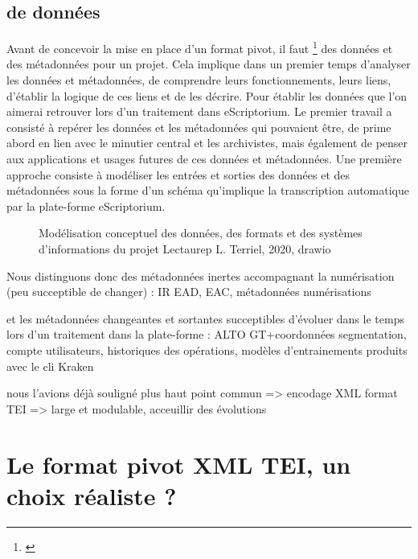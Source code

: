 \subsection{ de données}\label{Circonscrire un monde de données}

Avant de concevoir la mise en place d'un format pivot, il faut \footnote{\cite{poupeau_visite_2019}} des données et des métadonnées pour un projet. Cela implique dans un premier temps d'analyser les données et métadonnées, de comprendre leurs fonctionnements, leurs liens, d'établir la logique de ces liens et de les décrire. Pour établir les données que l'on aimerai retrouver lors d'un traitement dans eScriptorium. 
Le premier travail a consisté à repérer les données et les métadonnées qui pouvaient être, de prime abord en lien avec le minutier central et les archivistes, mais également de penser aux applications et usages futures de ces données et métadonnées. Une première approche consiste à modéliser les entrées et sorties des données et des métadonnées sous la forme d'un schéma qu'implique la transcription automatique par la plate-forme eScriptorium. 
\begin{figure}[h]
    \centering
    \centerline{}
    \caption{Modélisation conceptuel des données, des formats et des systèmes d'informations du projet Lectaurep \textcopyright L. Terriel, 2020, drawio}
    \label{fig:modélisation_données_lectaurep}
\end{figure}

Nous distinguons donc des métadonnées inertes accompagnant la numérisation (peu succeptible de changer) : IR EAD, EAC, métadonnées numérisations

et les métadonnées changeantes et sortantes succeptibles d'évoluer dans le temps lors d'un traitement dans la plate-forme :
ALTO GT+coordonnées segmentation, compte utilisateurs, historiques des opérations, modèles d'entrainements produits avec le cli Kraken

nous l'avions déjà souligné plus haut point commun => encodage XML 
format TEI => large et modulable, acceuillir des évolutions

\section{Le format pivot XML TEI, un choix réaliste ?}

